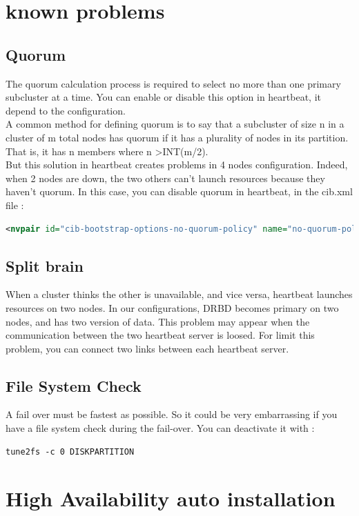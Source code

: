 \documentclass[a4paper,10pt]{report}
\begin{document}
\chapter{known problems}
\section{Quorum}
The quorum calculation process is required to select no more than one primary subcluster at a time. You can enable or disable this option in heartbeat, it depend to the configuration.\\
A common method for defining quorum is to say that a subcluster of size n in a cluster of m total nodes has quorum if it has a plurality of nodes in its partition. That is, it has n members where n \textgreater INT(m/2).\\
But this solution in heartbeat creates problems in 4 nodes configuration. Indeed, when 2 nodes are down, the two others can't launch resources because they haven't quorum. In this case, you
can disable quorum in heartbeat, in the cib.xml file :
\begin{lstlisting}[language=xml]
<nvpair id="cib-bootstrap-options-no-quorum-policy" name="no-quorum-policy" value="ignore"/>
\end{lstlisting}


\section{Split brain}
\label{splitbrain} 
When a cluster thinks the other is unavailable, and vice versa, heartbeat launches resources on two nodes. In our configurations, DRBD becomes primary on two nodes, and has two version of data. This problem may appear when the communication between the two heartbeat server is loosed.
For limit this problem, you can connect two links between each heartbeat server.



\section{File System Check}
A fail over must be fastest as possible. So it could be very embarrassing if you have a file system check during the fail-over. You can deactivate it with :
\begin{lstlisting}
tune2fs -c 0 DISKPARTITION
\end{lstlisting}

\chapter{High Availability auto installation}
\end{document}

